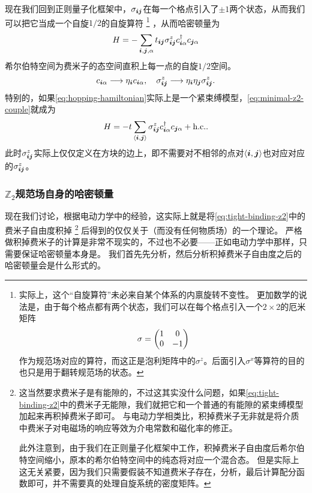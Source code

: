 现在我们回到正则量子化框架中，$\sigma_{\vb*{i} \vb*{j}}$在每一个格点引入了$\pm 1$两个状态，从而我们可以把它当成一个自旋$1/2$的自旋算符%
\footnote{实际上，这个“自旋算符”未必来自某个体系的内禀旋转不变性。
更加数学的说法是，由于每个格点都有两个状态，我们可以在每个格点引入一个$2\times 2$的厄米矩阵
\[
    {\sigma} = \pmqty{1 & 0 \\ 0 & -1}
\]
作为规范场对应的算符，而这正是泡利矩阵中的${\sigma}^z$。后面引入${\sigma}^x$等算符的目的也只是用于翻转规范场的状态。
}%
，从而哈密顿量为
\begin{equation}
    {H} = - \sum_{\vb*{i}, \vb*{j}, \alpha} t_{\vb*{i} \vb*{j}} {\sigma}^z_{\vb*{i} \vb*{j}} {c}_{\vb*{i} \alpha}^\dagger {c}_{\vb*{j} \alpha}
    \label{eq:minimal-z2-couple}
\end{equation}
希尔伯特空间为费米子的态空间直积上每一点的自旋$1/2$空间。
\begin{equation}
    {c}_{\vb*{i} \alpha} \longrightarrow \eta_{\vb*{i}} {c}_{\vb*{i} \alpha}, \quad {\sigma}_{\vb*{i} \vb*{j}}^z \longrightarrow \eta_{\vb*{i}} \eta_{\vb*{j}} {\sigma}_{\vb*{i} \vb*{j}}^z.
\end{equation}
特别的，如果\eqref{eq:hopping-hamiltonian}实际上是一个紧束缚模型，\eqref{eq:minimal-z2-couple}就成为
\begin{equation}
    {H} = - t \sum_{\langle \vb*{i}, \vb*{j} \rangle} {\sigma}^z_{\vb*{i} \vb*{j}} {c}_{\vb*{i} \alpha}^\dagger {c}_{\vb*{j} \alpha} + \text{h.c.}.
    \label{eq:tight-binding-z2}
\end{equation}
此时$\sigma_{\vb*{i} \vb*{j}}^z$实际上仅仅定义在方块的边上，即不需要对不相邻的点对$\langle \vb*{i}, \vb*{j} \rangle$也对应对应的$\sigma_{\vb*{i} \vb*{j}}^z$。

\subsubsection{$\mathbb{Z}_2$规范场自身的哈密顿量}

现在我们讨论，根据电动力学中的经验，这实际上就是将\eqref{eq:tight-binding-z2}中的费米子自由度积掉%
\footnote{
    这当然要求费米子是有能隙的，不过这其实没什么问题，如果\eqref{eq:tight-binding-z2}中的费米子无能隙，我们就把它和一个普通的有能隙的紧束缚模型加起来再积掉费米子即可。
    与电动力学相类比，积掉费米子无非就是将介质中费米子对电磁场的响应等效为介电常数和磁化率的修正。

    此外注意到，由于我们在正则量子化框架中工作，积掉费米子自由度后希尔伯特空间缩小，原本的希尔伯特空间中的纯态将对应一个混合态。
    但是实际上这无关紧要，因为我们只需要假装不知道费米子存在，分析，最后计算配分函数即可，并不需要真的处理自旋系统的密度矩阵。}%
后得到的仅仅关于（而没有任何物质场）的一个理论。
严格做积掉费米子的计算是非常不现实的，不过也不必要——正如电动力学中那样，只需要保证哈密顿量本身是。
我们首先先分析，然后分析积掉费米子自由度之后的哈密顿量会是什么形式的。

